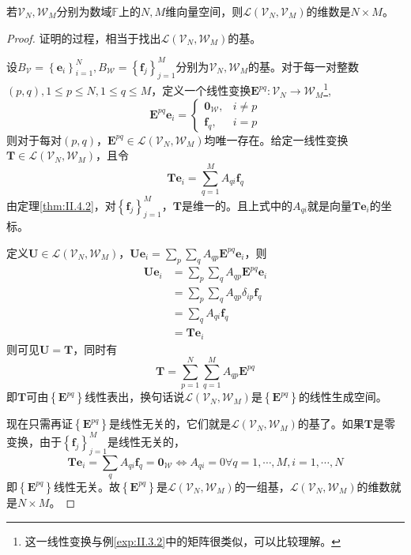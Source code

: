 \documentclass[main.tex]{subfiles}
\begin{document}
\begin{theorem}\label{thm:II.4.3}
若$\mathcal{V}_N,\mathcal{W}_M$分别为数域$\mathbb{F}$上的$N,M$维向量空间，则$\mathcal{L}\left(\mathcal{V}_N,\mathcal{V}_M\right)$的维数是$N\times M$。
\end{theorem}
\begin{proof}
证明的过程，相当于找出$\mathcal{L}\left(\mathcal{V}_N,\mathcal{W}_M\right)$的基。

设$B_\mathcal{V}=\left\{\mathbf{e}_i\right\}_{i=1}^N,B_\mathcal{W}=\left\{\mathbf{f}_j\right\}_{j=1}^M$分别为$\mathcal{V}_N,\mathcal{W}_M$的基。对于每一对整数$\left(p,q\right),1\leq p\leq N,1\leq q\leq M$，定义一个线性变换$\mathbf{E}^{pq}:\mathcal{V}_N\rightarrow\mathcal{W}_M$\footnote{这一线性变换与例\ref{exp:II.3.2}中的矩阵很类似，可以比较理解。},
\[
\mathbf{E}^{pq}\mathbf{e}_i=\left\{\begin{array}{cc}
    \mathbf{0}_\mathcal{W},&i\neq p  \\
     \mathbf{f}_q,&i=p 
\end{array}\right.
\]
则对于每对$\left(p,q\right)$，$\mathbf{E}^{pq}\in\mathcal{L}\left(\mathcal{V}_N,\mathcal{W}_M\right)$均唯一存在。给定一线性变换$\mathbf{T}\in\mathcal{L}\left(\mathcal{V}_N,\mathcal{W}_M\right)$，且令
\[\mathbf{Te}_i=\sum_{q=1}^MA_{qi}\mathbf{f}_q\]
由定理\ref{thm:II.4.2}，对$\left\{\mathbf{f}_j\right\}_{j=1}^M$，$\mathbf{T}$是维一的。且上式中的$A_{qi}$就是向量$\mathbf{Te}_i$的坐标。

定义$\mathbf{U}\in\mathcal{L}\left(\mathcal{V}_N,\mathcal{W}_M\right)$，$\mathbf{Ue}_i=\sum_p\sum_qA_{qp}\mathbf{E}^{pq}\mathbf{e}_i$，则
\begin{align*}
    \mathbf{Ue}_i&=\sum_p\sum_qA_{qp}\mathbf{E}^{pq}\mathbf{e}_i\\
    &=\sum_p\sum_qA_{qp}\delta_{ip}\mathbf{f}_q\\
    &=\sum_qA_{qi}\mathbf{f}_q\\
    &=\mathbf{Te}_i
\end{align*}
则可见$\mathbf{U}=\mathbf{T}$，同时有
\[\mathbf{T}=\sum_{p=1}^N\sum_{q=1}^MA_{qp}\mathbf{E}^{pq}\]
即$\mathbf{T}$可由$\left\{\mathbf{E}^{pq}\right\}$线性表出，换句话说$\mathcal{L}\left(\mathcal{V}_N,\mathcal{W}_M\right)$是$\left\{\mathbf{E}^{pq}\right\}$的线性生成空间。

现在只需再证$\left\{\mathbf{E}^{pq}\right\}$是线性无关的，它们就是$\mathcal{L}\left(\mathcal{V}_N,\mathcal{W}_M\right)$的基了。如果$\mathbf{T}$是零变换，由于$\left\{\mathbf{f}_j\right\}_{j=1}^M$是线性无关的，
\[\mathbf{Te}_i=\sum_q A_{qi}\mathbf{f}_q=\mathbf{0}_\mathcal{W}\Leftrightarrow A_{qi}=0\forall q=1,\cdots,M,i=1,\cdots,N\]
即$\left\{\mathbf{E}^{pq}\right\}$线性无关。故$\left\{\mathbf{E}^{pq}\right\}$是$\mathcal{L}\left(\mathcal{V}_N,\mathcal{W}_M\right)$的一组基，$\mathcal{L}\left(\mathcal{V}_N,\mathcal{W}_M\right)$的维数就是$N\times M$。
\end{proof}
\end{document}

